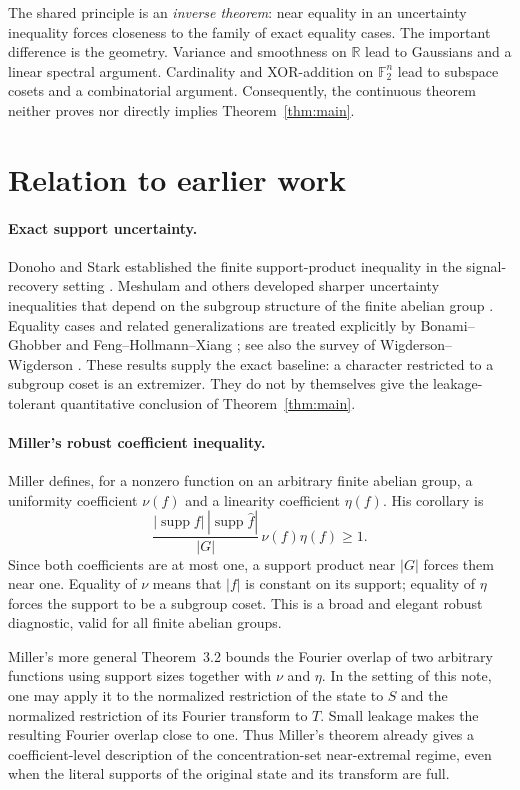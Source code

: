 \documentclass[11pt]{article}
\theoremstyle{remark}
\newcommand{\F}{\mathbb F}
\newcommand{\1}{\mathbf 1}
\newcommand{\supp}{\operatorname{supp}}
\begin{document}
The shared principle is an \emph{inverse theorem}: near equality in an
uncertainty inequality forces closeness to the family of exact equality
cases. The important difference is the geometry. Variance and smoothness on
$\mathbb R$ lead to Gaussians and a linear spectral argument. Cardinality
and XOR-addition on $\F_2^n$ lead to subspace cosets and a combinatorial
argument. Consequently, the continuous theorem neither proves nor directly
implies Theorem~\ref{thm:main}.

\section{Relation to earlier work}\label{sec:literature}

\paragraph{Exact support uncertainty.}
Donoho and Stark established the finite support-product inequality in the
signal-recovery setting \cite{DonohoStark1989}. Meshulam and others developed
sharper uncertainty inequalities that depend on the subgroup structure of
the finite abelian group \cite{Meshulam2006}. Equality cases and related
generalizations are treated explicitly by Bonami--Ghobber and
Feng--Hollmann--Xiang
\cite{BonamiGhobber2013,FengHollmannXiang2019}; see also the survey of
Wigderson--Wigderson \cite{WigdersonWigderson2021}. These results supply the
exact baseline: a character restricted to a subgroup coset is an extremizer.
They do not by themselves give the leakage-tolerant quantitative conclusion
of Theorem~\ref{thm:main}.

\paragraph{Miller's robust coefficient inequality.}
Miller \cite[Theorem 3.2 and Corollary 3.1]{Miller2026} defines, for a
nonzero function on an arbitrary finite abelian group, a uniformity
coefficient $\nu(f)$ and a linearity coefficient $\eta(f)$. His corollary is
\[
  \frac{|\supp f|\,|\supp\widehat f|}{|G|}
  \,\nu(f)\eta(f)\geq1.
\]
Since both coefficients are at most one, a support product near $|G|$
forces them near one. Equality of $\nu$ means that $|f|$ is constant on its
support; equality of $\eta$ forces the support to be a subgroup coset. This
is a broad and elegant robust diagnostic, valid for all finite abelian
groups.

Miller's more general Theorem~3.2 bounds the Fourier overlap of two arbitrary
functions using support sizes together with $\nu$ and $\eta$. In the setting
of this note, one may apply it to the normalized restriction of the state to
$S$ and the normalized restriction of its Fourier transform to $T$. Small
leakage makes the resulting Fourier overlap close to one. Thus Miller's
theorem already gives a coefficient-level description of the
concentration-set near-extremal regime, even when the literal supports of the
original state and its transform are full.
\end{document}
